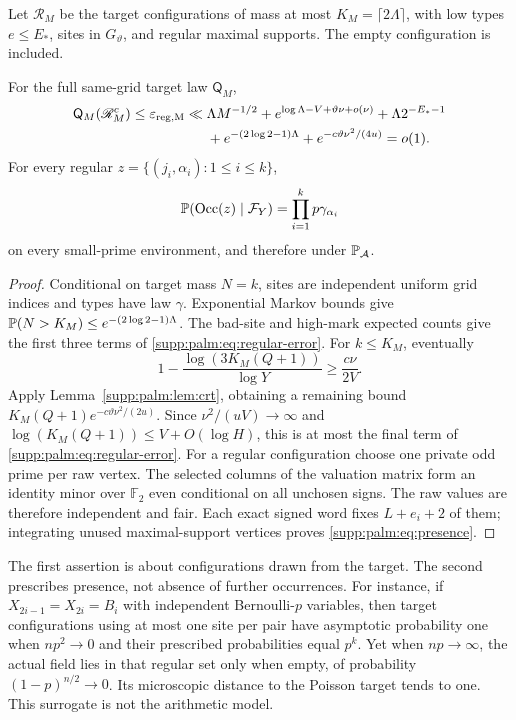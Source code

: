 Let $\mathscr R_M$ be the target configurations of mass at most $K_M=\lceil2\Lambda\rceil$, with low types $e\le E_*$, sites in $G_\vartheta$, and regular maximal supports. The empty configuration is included.
\begin{theorem}\label{supp:palm:thm:regular}
For the full same-grid target law $\mathsf Q_M$,
\begin{align}\label{supp:palm:eq:regular-error}
 \mathsf Q_M(\mathscr R_M^c)\le\varepsilon_{\rm reg,M}
 \ll{}&\Lambda M^{-1/2}+e^{\log\Lambda-V+\vartheta\nu+o(\nu)}
           +\Lambda2^{-E_*-1}\notag\\
 &+e^{-(2\log2-1)\Lambda}+e^{-c\vartheta\nu^2/(4u)}=o(1).
\end{align}
For every regular $z=\{(j_i,\alpha_i):1\le i\le k\}$,
\begin{equation}\label{supp:palm:eq:presence}
 \mathbb P(\operatorname{Occ}(z)\mid\mathcal F_Y)
       =\prod_{i=1}^k p\gamma_{\alpha_i}
\end{equation}
on every small-prime environment, and therefore under $\mathbb P_{\mathcal A}$.
\end{theorem}
\begin{proof}
Conditional on target mass $N=k$, sites are independent uniform grid indices and types have law $\gamma$. Exponential Markov bounds give
$\mathbb P(N>K_M)\le e^{-(2\log2-1)\Lambda}$.
The bad-site and high-mark expected counts give the first three terms of
\eqref{supp:palm:eq:regular-error}.
For $k\le K_M$, eventually
\[
 1-\frac{\log(3K_M(Q+1))}{\log Y}\ge\frac{c\nu}{2V}.
\]
Apply Lemma~\ref{supp:palm:lem:crt}, obtaining a remaining bound
$K_M(Q+1)e^{-c\vartheta\nu^2/(2u)}$.
Since $\nu^2/(uV)\to\infty$ and $\log(K_M(Q+1))\le V+O(\log H)$, this is at most the final term of \eqref{supp:palm:eq:regular-error}.
For a regular configuration choose one private odd prime per raw vertex. The selected columns of the valuation matrix form an identity minor over $\mathbb F_2$ even conditional on all unchosen signs. The raw values are therefore independent and fair. Each exact signed word fixes $L+e_i+2$ of them; integrating unused maximal-support vertices proves \eqref{supp:palm:eq:presence}.
\end{proof}
The first assertion is about configurations drawn from the target. The second prescribes presence, not absence of further occurrences. For instance, if $X_{2i-1}=X_{2i}=B_i$ with independent Bernoulli-$p$ variables, then target configurations using at most one site per pair have asymptotic probability one when $np^2\to0$ and their prescribed probabilities equal $p^k$. Yet when $np\to\infty$, the actual field lies in that regular set only when empty, of probability $(1-p)^{n/2}\to0$. Its microscopic distance to the Poisson target tends to one. This surrogate is not the arithmetic model.

